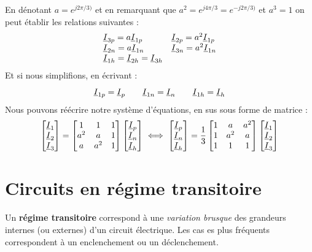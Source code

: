 \documentclass[12pt,a4paper]{article}
\newcommand{\ui}{\uline{I} }
\begin{document}
En dénotant $a = e^{j2\pi/3)}$ et en remarquant que $a^2 = e^{j4\pi/3} = e^{-j2\pi/3)}$ et $a^3 = 1$ on peut établir les relations suivantes :
\[\begin{array}{ll}
	\ui_{3p} = a\ui_{1p} & \ui_{2p} = a^2 \ui_{1p}\\
	\ui_{2n} = a\ui_{1n} & \ui_{3n} = a^2 \ui_{1n}\\
	\ui_{1h} = \ui_{2h} = \ui_{3h}
\end{array}\]
Et si nous simplifions, en écrivant :
\[\ui_{1p} = \ui_p \qquad \ui_{1n} = \ui_n \qquad \ui_{1h} = \ui_h\]
Nous pouvons réécrire notre système d'équations, en sus sous forme de matrice :
\[\begin{bmatrix}
\ui_1\\
\ui_2\\
\ui_3
\end{bmatrix} = \begin{bmatrix}
	1 & 1 & 1\\
	a^2 & a & 1\\
	a & a^2 & 1
\end{bmatrix} \begin{bmatrix}
\ui_p\\
\ui_n\\
\ui_h
\end{bmatrix} \iff \begin{bmatrix}
	\ui_p\\
	\ui_n\\
	\ui_h
\end{bmatrix} = \frac{1}{3}\begin{bmatrix}
1 & a & a^2\\
1 & a^2 & a\\
1 & 1 & 1
\end{bmatrix} \begin{bmatrix}
	\ui_1\\
	\ui_2\\
	\ui_3
\end{bmatrix}\]




\section[Régimes transitoires]{Circuits en régime transitoire}
\setcounter{equation}{0}
Un \textbf{régime transitoire} correspond à une \textit{variation brusque} des grandeurs internes (ou externes) d'un circuit électrique. Les cas es plus fréquents correspondent à un enclenchement ou un déclenchement.
\end{document}
